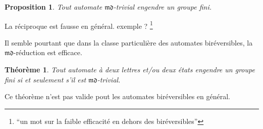 \documentclass[11pt,a4paper]{article}
\newtheorem{prop}{Proposition}
\newtheorem{thm}{Théorème}
\begin{document}
\begin{prop}
  Tout automate $\mathfrak{md}$-trivial engendre un groupe fini.
\end{prop}

La réciproque est fausse en général. exemple ? \footnote{``un mot sur la faible efficacité en dehors des biréversibles''}

Il semble pourtant que dans la classe particulière des automates biréversibles, la $\mathfrak{md}$-réduction est efficace.

\begin{thm}{\cite{Klimann13}}
  \label{thm:K}
  Tout automate à deux lettres et/ou deux états engendre un groupe fini si et seulement s'il est $\mathfrak{md}$-trivial.
\end{thm}

Ce théorème n'est pas valide pout les automates biréversibles en général.
\end{document}
